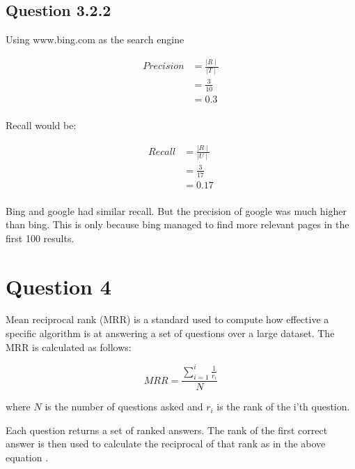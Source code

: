 \documentclass[10pt,a4paper]{article}
\begin{document}
\subsection{Question 3.2.2}

Using www.bing.com as the search engine

\begin{equation}
\begin{split}
Precision &= \frac{\mid R \mid}{\mid T \mid} \\
&= \frac{3}{10}\\
&=0.3\\ 
\end{split}
\end{equation}

Recall would be:

\begin{equation}
\begin{split}
Recall &= \frac{\mid R \mid}{\mid U \mid} \\ 
&= \frac{3}{17} \\
&= 0.17 \\
\end{split}
\end{equation}

Bing and google had similar recall. But the precision of google was much higher than bing. This is only because bing managed to find more relevant pages in the first 100 results.

\section{Question 4}

Mean reciprocal rank (MRR) is a standard used to compute how effective a specific algorithm is at answering a set of questions over a large dataset. The MRR is calculated as follows:

\begin{equation}
MRR = \frac{\sum_{i=1}^i\frac{1}{r_i}}{N}
\end{equation}

where $N$ is the number of questions asked and $r_i$ is the rank of the i'th question. 

Each question returns a set of ranked answers. The rank of the first correct answer is then used to calculate the reciprocal of that rank as in the above equation \citep{jur}. 


\end{document}

